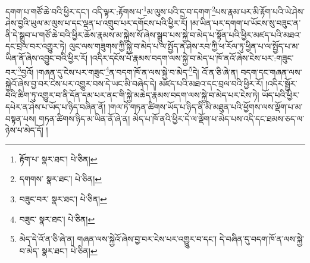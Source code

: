 དགག་པ་གཙོ་ཆེ་བའི་ཕྱིར་དང་། འདི་ལྟར་:རྟོགས་པ་\footnote{རྟོག་པ་  སྣར་ཐང་།  པེ་ཅིན། }མ་ལུས་པའི་དྲ་བ་དགག་\footnote{དགགས་  སྣར་ཐང་།  པེ་ཅིན། }པས་རྣམ་པར་མི་རྟོག་པའི་ཡེ་ཤེས་ཤེས་བྱའི་ཡུལ་མ་ལུས་པ་དང་ལྡན་པ་འགྲུབ་པར་དགོངས་པའི་ཕྱིར་རོ། །མ་ཡིན་པར་དགག་པ་ཡོངས་སུ་བཟུང་ན་ནི་དེ་སྒྲུབ་པ་གཙོ་ཆེ་བའི་ཕྱིར་ཆོས་རྣམས་མ་སྐྱེས་སོ་ཞེས་སྒྲུབ་པས་སྐྱེ་བ་མེད་པ་སྟོན་པའི་ཕྱིར་མཛད་པའི་མཐའ་དང་བྲལ་བར་འགྱུར་ཏེ། ལུང་ལས་གཟུགས་ཀྱི་སྐྱེ་བ་མེད་པ་ལ་སྤྱོད་ན་ཤེས་རབ་ཀྱི་ཕ་རོལ་ཏུ་ཕྱིན་པ་ལ་སྤྱོད་པ་མ་ཡིན་ནོ་ཞེས་འབྱུང་བའི་ཕྱིར་རོ། །འདིར་དངོས་པོ་རྣམས་བདག་ལས་སྐྱེ་བ་མེད་པ་ཁོ་ནའོ་ཞེས་ངེས་པར་:གཟུང་བར་\footnote{བཟུང་བར་  སྣར་ཐང་།  པེ་ཅིན། }བྱའོ། །གཞན་དུ་ངེས་པར་གཟུང་\footnote{བཟུང་  སྣར་ཐང་།  པེ་ཅིན། }ན་བདག་ཁོ་ན་ལས་སྐྱེ་བ་མེད་\footnote{མེད་དེ་འོ་ན་ཅི་ཞེ་ན། གཞན་ལས་སྐྱེའོ་ཞེས་བྱ་བར་ངེས་པར་འགྱུུར་བ་དང་། དེ་བཞིན་དུ་བདག་ཁོ་ན་ལས་སྐྱེ་བ་མེད་  སྣར་ཐང་།  པེ་ཅིན། }དེ། འོ་ན་ཅི་ཞེ་ན། བདག་དང་གཞན་ལས་སྐྱེའོ་ཞེས་བྱ་བར་ངེས་པར་འགྱུར་བས་དེ་ཡང་མི་བཞེད་དེ། མཛད་པའི་མཐའ་དང་བྲལ་བའི་ཕྱིར་རོ། །འདིར་སྦྱོར་བའི་ཚིག་ཏུ་འགྱུར་བ་ནི་དོན་དམ་པར་ནང་གི་སྐྱེ་མཆེད་རྣམས་བདག་ལས་སྐྱེ་བ་མེད་པར་ངེས་ཏེ། ཡོད་པའི་ཕྱིར་དཔེར་ན་ཤེས་པ་ཡོད་པ་ཉིད་བཞིན་ནོ། །གལ་ཏེ་གཏན་ཚིགས་ཡོད་པ་ཉིད་ནི་མི་མཐུན་པའི་ཕྱོགས་ལས་ལྡོག་པ་མ་བསྟན་པས། གཏན་ཚིགས་ཉིད་མ་ཡིན་ནོ་ཞེ་ན། མེད་པ་ཁོ་ནའི་ཕྱིར་དེ་ལ་ལྡོག་པ་མེད་པས་འདི་དང་ཐམས་ཅད་ལ་ཉེས་པ་མེད་དོ། །

